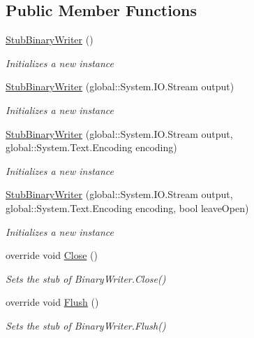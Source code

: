 \subsection*{Public Member Functions}
\begin{DoxyCompactItemize}
\item 
\hyperlink{class_system_1_1_i_o_1_1_fakes_1_1_stub_binary_writer_a1518ca94a1f5a3fb78254175f9e51f32}{Stub\-Binary\-Writer} ()
\begin{DoxyCompactList}\small\item\em Initializes a new instance\end{DoxyCompactList}\item 
\hyperlink{class_system_1_1_i_o_1_1_fakes_1_1_stub_binary_writer_a109be33ba839534538d5600f958dcadb}{Stub\-Binary\-Writer} (global\-::\-System.\-I\-O.\-Stream output)
\begin{DoxyCompactList}\small\item\em Initializes a new instance\end{DoxyCompactList}\item 
\hyperlink{class_system_1_1_i_o_1_1_fakes_1_1_stub_binary_writer_aa64c5d818c191841e1adb4b0d0f2db47}{Stub\-Binary\-Writer} (global\-::\-System.\-I\-O.\-Stream output, global\-::\-System.\-Text.\-Encoding encoding)
\begin{DoxyCompactList}\small\item\em Initializes a new instance\end{DoxyCompactList}\item 
\hyperlink{class_system_1_1_i_o_1_1_fakes_1_1_stub_binary_writer_a6e89b7ed7f884ca5f4464891315aa14f}{Stub\-Binary\-Writer} (global\-::\-System.\-I\-O.\-Stream output, global\-::\-System.\-Text.\-Encoding encoding, bool leave\-Open)
\begin{DoxyCompactList}\small\item\em Initializes a new instance\end{DoxyCompactList}\item 
override void \hyperlink{class_system_1_1_i_o_1_1_fakes_1_1_stub_binary_writer_abfa9c3b72f9618571485cc0297716ab5}{Close} ()
\begin{DoxyCompactList}\small\item\em Sets the stub of Binary\-Writer.\-Close()\end{DoxyCompactList}\item 
override void \hyperlink{class_system_1_1_i_o_1_1_fakes_1_1_stub_binary_writer_a1b448ebdba1648601bcc0ff45a10e7ff}{Flush} ()
\begin{DoxyCompactList}\small\item\em Sets the stub of Binary\-Writer.\-Flush()\end{DoxyCompactList}\item 

\end{DoxyCompactItemize}
